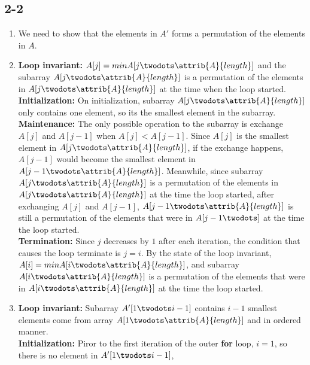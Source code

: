 \subsection{2-2}
\begin{enumerate}[leftmargin=*]
    \item We need to show that the elements in $A'$ forms a permutation
        of the elements in $A$.
    \item \textbf{Loop invariant:} $A[j]=min{A[j\twodots \attrib{A}{length}]}$
        and the subarray $A[j\twodots \attrib{A}{length}]$ is a permutation of
        the elements in $A[j\twodots \attrib {A}{length}]$ at the time when
        the loop started. \\
        \textbf{Initialization:} On initialization, subarray
        $A[j\twodots \attrib{A}{length}]$ only contains one element, so its
        the smallest element in the subarray. \\
        \textbf{Maintenance:} The only possible operation to the subarray is
        exchange $A[j]$ and $A[j-1]$ when $A[j]<A[j-1]$. Since $A[j]$ is the
        smallest element in $A[j\twodots \attrib{A}{length}]$, if the exchange
        happens, $A[j-1]$ would become the smallest element in $A[j-1\twodots
        \attrib{A}{length}]$. Meanwhile, since subarray
        $A[j\twodots \attrib{A}{length}]$ is a permutation of the elements in
        $A[j\twodots \attrib{A}{length}]$ at the time the loop started, after
        exchanging $A[j]$ and $A[j-1]$, $A[j-1\twodots \attrib{A}{length}]$ is
        still a permutation of the elements that were in $A[j-1\twodots]$
        at the time the loop started. \\
        \textbf{Termination:} Since $j$ decreases by $1$ after each iteration,
        the condition that causes the loop terminate is $j=i$. By the state of
        the loop invariant, $A[i]=min{A[i\twodots \attrib {A}{length}]}$, and
        subarray $A[i\twodots \attrib{A}{length}]$ is a permutation of the
        elements that were in $A[i\twodots \attrib {A}{length}]$ at the time
        the loop started.
    \item \textbf{Loop invariant:} Subarray $A'[1\twodots i-1]$ contains $i-1$
        smallest elements come from array $A[1\twodots \attrib{A}{length}]$
        and in ordered manner. \\
        \textbf{Initialization:} Piror to the first iteration of the outer
        \textbf{for} loop, $i=1$, so there is no element in $A'[1\twodots i-1]$,

\end{enumerate}
